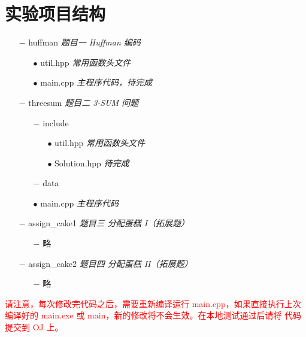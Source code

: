 \documentclass[12pt,a4paper]{article}
\begin{document}
\section{实验项目结构}

\begin{itemize}[noitemsep]
    \item[$-$] huffman \textit{题目一 \hspace{0.2cm}Huffman 编码}
        \begin{itemize}[noitemsep]
            \item[$\bullet$] util.hpp \textit{常用函数头文件}
            \item[$\bullet$] main.cpp \textit{主程序代码，待完成}
        \end{itemize}
    \item[$-$] threesum \textit{题目二 \hspace{0.2cm}3-SUM 问题}
        \begin{itemize}[noitemsep]
            \item[$-$] include
                \begin{itemize}[noitemsep]
                    \item[$\bullet$] util.hpp \textit{常用函数头文件}
                    \item[$\bullet$] Solution.hpp \textit{待完成}
                \end{itemize}
            \item[$-$] data
            \item[$\bullet$] main.cpp \textit{主程序代码}
        \end{itemize}
    \item[$-$] assign\_cake1 \textit{题目三 \hspace{0.2cm}分配蛋糕 I（拓展题）}
        \begin{itemize}[noitemsep]
            \item[$-$] 略
        \end{itemize}
    \item[$-$] assign\_cake2 \textit{题目四 \hspace{0.2cm}分配蛋糕 II（拓展题）}
        \begin{itemize}[noitemsep]
            \item[$-$] 略
        \end{itemize}
\end{itemize}


\textcolor{red}{请注意，每次修改完代码之后，需要重新编译运行 main.cpp，如果直接执行上次编译好的 main.exe 或 main，新的修改将不会生效。在本地测试通过后请将
    代码提交到 OJ 上。}
\end{document}
